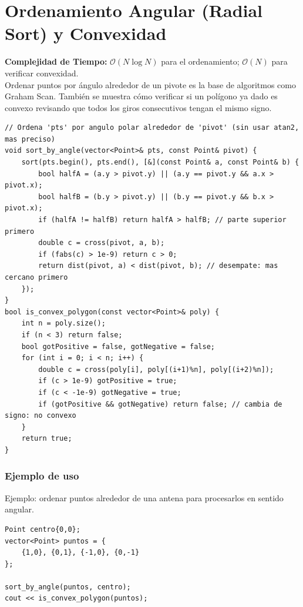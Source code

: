 \documentclass[10pt,twocolumn,letterpaper]{report}
\begin{document}
\section{Ordenamiento Angular (Radial Sort) y Convexidad}
\textbf{Complejidad de Tiempo:} $\mathcal{O}(N \log N)$ para el ordenamiento; $\mathcal{O}(N)$ para verificar convexidad. \\
Ordenar puntos por ángulo alrededor de un pivote es la base de algoritmos como Graham Scan. También se muestra cómo verificar si un polígono ya dado es convexo revisando que todos los giros consecutivos tengan el mismo signo.
\begin{lstlisting}
// Ordena 'pts' por angulo polar alrededor de 'pivot' (sin usar atan2, mas preciso)
void sort_by_angle(vector<Point>& pts, const Point& pivot) {
    sort(pts.begin(), pts.end(), [&](const Point& a, const Point& b) {
        bool halfA = (a.y > pivot.y) || (a.y == pivot.y && a.x > pivot.x);
        bool halfB = (b.y > pivot.y) || (b.y == pivot.y && b.x > pivot.x);
        if (halfA != halfB) return halfA > halfB; // parte superior primero
        double c = cross(pivot, a, b);
        if (fabs(c) > 1e-9) return c > 0;
        return dist(pivot, a) < dist(pivot, b); // desempate: mas cercano primero
    });
}
bool is_convex_polygon(const vector<Point>& poly) {
    int n = poly.size();
    if (n < 3) return false;
    bool gotPositive = false, gotNegative = false;
    for (int i = 0; i < n; i++) {
        double c = cross(poly[i], poly[(i+1)%n], poly[(i+2)%n]);
        if (c > 1e-9) gotPositive = true;
        if (c < -1e-9) gotNegative = true;
        if (gotPositive && gotNegative) return false; // cambia de signo: no convexo
    }
    return true;
}
\end{lstlisting}
\subsubsection*{Ejemplo de uso}
Ejemplo: ordenar puntos alrededor de una antena para procesarlos en sentido angular.
\begin{lstlisting}
Point centro{0,0};
vector<Point> puntos = {
    {1,0}, {0,1}, {-1,0}, {0,-1}
};

sort_by_angle(puntos, centro);
cout << is_convex_polygon(puntos);
\end{lstlisting}
\end{document}
